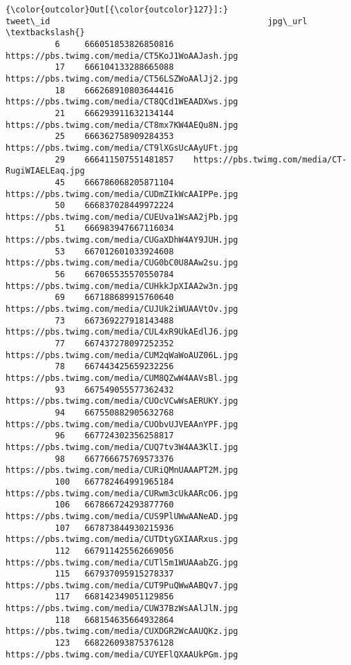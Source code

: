 \documentclass[11pt]{article}
\begin{document}
\begin{Verbatim}[commandchars=\\\{\}]
{\color{outcolor}Out[{\color{outcolor}127}]:}                 tweet\_id                                            jpg\_url  \textbackslash{}
          6     666051853826850816    https://pbs.twimg.com/media/CT5KoJ1WoAAJash.jpg   
          17    666104133288665088    https://pbs.twimg.com/media/CT56LSZWoAAlJj2.jpg   
          18    666268910803644416    https://pbs.twimg.com/media/CT8QCd1WEAADXws.jpg   
          21    666293911632134144    https://pbs.twimg.com/media/CT8mx7KW4AEQu8N.jpg   
          25    666362758909284353    https://pbs.twimg.com/media/CT9lXGsUcAAyUFt.jpg   
          29    666411507551481857    https://pbs.twimg.com/media/CT-RugiWIAELEaq.jpg   
          45    666786068205871104    https://pbs.twimg.com/media/CUDmZIkWcAAIPPe.jpg   
          50    666837028449972224    https://pbs.twimg.com/media/CUEUva1WsAA2jPb.jpg   
          51    666983947667116034    https://pbs.twimg.com/media/CUGaXDhW4AY9JUH.jpg   
          53    667012601033924608    https://pbs.twimg.com/media/CUG0bC0U8AAw2su.jpg   
          56    667065535570550784    https://pbs.twimg.com/media/CUHkkJpXIAA2w3n.jpg   
          69    667188689915760640    https://pbs.twimg.com/media/CUJUk2iWUAAVtOv.jpg   
          73    667369227918143488    https://pbs.twimg.com/media/CUL4xR9UkAEdlJ6.jpg   
          77    667437278097252352    https://pbs.twimg.com/media/CUM2qWaWoAUZ06L.jpg   
          78    667443425659232256    https://pbs.twimg.com/media/CUM8QZwW4AAVsBl.jpg   
          93    667549055577362432    https://pbs.twimg.com/media/CUOcVCwWsAERUKY.jpg   
          94    667550882905632768    https://pbs.twimg.com/media/CUObvUJVEAAnYPF.jpg   
          96    667724302356258817    https://pbs.twimg.com/media/CUQ7tv3W4AA3KlI.jpg   
          98    667766675769573376    https://pbs.twimg.com/media/CURiQMnUAAAPT2M.jpg   
          100   667782464991965184    https://pbs.twimg.com/media/CURwm3cUkAARcO6.jpg   
          106   667866724293877760    https://pbs.twimg.com/media/CUS9PlUWwAANeAD.jpg   
          107   667873844930215936    https://pbs.twimg.com/media/CUTDtyGXIAARxus.jpg   
          112   667911425562669056    https://pbs.twimg.com/media/CUTl5m1WUAAabZG.jpg   
          115   667937095915278337    https://pbs.twimg.com/media/CUT9PuQWwAABQv7.jpg   
          117   668142349051129856    https://pbs.twimg.com/media/CUW37BzWsAAlJlN.jpg   
          118   668154635664932864    https://pbs.twimg.com/media/CUXDGR2WcAAUQKz.jpg   
          123   668226093875376128    https://pbs.twimg.com/media/CUYEFlQXAAUkPGm.jpg   

\end{Verbatim}
\end{document}
